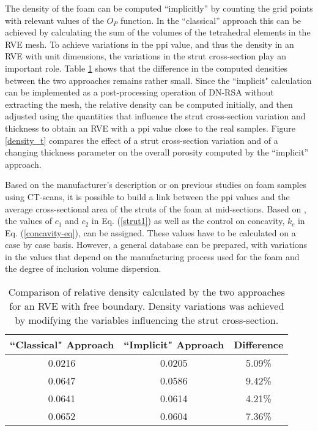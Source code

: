 The density of the foam can be computed ``implicitly'' by counting the grid points with relevant values of the $ O_P $ function. In the ``classical'' approach this can be achieved by calculating the sum of the volumes of the tetrahedral elements in the RVE mesh. To achieve variations in the ppi value, and thus the density in an RVE with unit dimensions, the variations in the strut cross-section play an important role. Table \ref{tab_relden} shows that the difference in the computed densities between the two approaches remains rather small. Since the ``implicit" calculation can be implemented as a post-processing operation of DN-RSA without extracting the mesh, the relative density can be computed initially, and then adjusted using  the quantities that influence the strut cross-section variation and thickness to obtain an RVE with a ppi value close to the real samples. Figure \ref{density_t} compares the effect of a strut cross-section variation and of a changing thickness parameter on the overall porosity computed by the ``implicit'' approach.

Based on the manufacturer's description or on previous studies on foam samples using CT-scans, it is possible to build a link between the ppi values and the average cross-sectional area of the struts of the foam at mid-sections. Based on \cite{jangMicrostructureOpencellFoams2008,jungMicrostructuralCharacterisationExperimental2017,perrotPeriodicUnitCell2007}, the values of $ c_1 $ and $ c_2 $ in Eq. (\ref{strut1}) as well as the control on concavity, $ k_c $ in Eq. (\ref{concavity-eq}), can be assigned. These values have to be calculated on a case by case basis. However, a general database can be prepared, with variations in the values that depend on the manufacturing process used for the foam and the degree of inclusion volume dispersion. 

\begin{table}
\small{
	\begin{center}
		\caption{Comparison of relative density calculated by the two approaches for an RVE with free boundary. Density variations was achieved by modifying the variables influencing the strut cross-section.
}\label{tab_relden}
		\begin{tabularx}{\columnwidth}{c c c}
			\toprule
			``Classical" Approach & ``Implicit" Approach & Difference\\[0.5ex]
			\midrule
			0.0216 & 0.0205 & 5.09\%\\[1ex]
			0.0647 & 0.0586 & 9.42\%\\[1ex]
			0.0641 & 0.0614 & 4.21\%\\[1ex]
			0.0652 & 0.0604 & 7.36\%\\[1ex]
			\bottomrule
		\end{tabularx}
	\end{center}}
\end{table}

